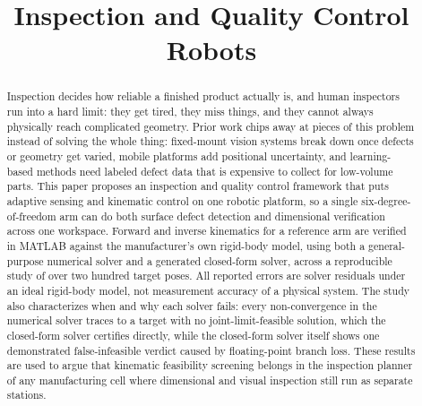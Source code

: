 \documentclass[conference]{IEEEtran}
\begin{document}
\title{Inspection and Quality Control Robots}

\author{
\and
{}
\and
{}
}

\maketitle

\begin{abstract}
Inspection decides how reliable a finished product actually is, and human inspectors run into a hard limit: they get tired, they miss things, and they cannot always physically reach complicated geometry. Prior work chips away at pieces of this problem instead of solving the whole thing: fixed-mount vision systems break down once defects or geometry get varied, mobile platforms add positional uncertainty, and learning-based methods need labeled defect data that is expensive to collect for low-volume parts. This paper proposes an inspection and quality control framework that puts adaptive sensing and kinematic control on one robotic platform, so a single six-degree-of-freedom arm can do both surface defect detection and dimensional verification across one workspace. Forward and inverse kinematics for a reference arm are verified in MATLAB against the manufacturer's own rigid-body model, using both a general-purpose numerical solver and a generated closed-form solver, across a reproducible study of over two hundred target poses. All reported errors are solver residuals under an ideal rigid-body model, not measurement accuracy of a physical system. The study also characterizes when and why each solver fails: every non-convergence in the numerical solver traces to a target with no joint-limit-feasible solution, which the closed-form solver certifies directly, while the closed-form solver itself shows one demonstrated false-infeasible verdict caused by floating-point branch loss. These results are used to argue that kinematic feasibility screening belongs in the inspection planner of any manufacturing cell where dimensional and visual inspection still run as separate stations.
\end{abstract}
\end{document}
